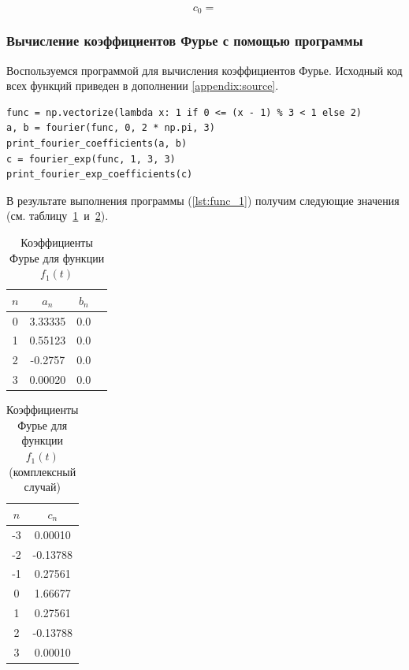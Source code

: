 \begin{equation}
    c_0 = 
\end{equation}

\subsubsection{Вычисление коэффициентов Фурье с помощью программы}
Воспользуемся программой для вычисления коэффициентов Фурье. Исходный код всех функций приведен в дополнении \ref{appendix:source}.

\begin{lstlisting}[style=python_white, caption=Вычисление коэффициентов Фурье, label=lst:func_1]
func = np.vectorize(lambda x: 1 if 0 <= (x - 1) % 3 < 1 else 2)
a, b = fourier(func, 0, 2 * np.pi, 3)
print_fourier_coefficients(a, b)
c = fourier_exp(func, 1, 3, 3)
print_fourier_exp_coefficients(c)
\end{lstlisting}

В результате выполнения программы (\ref{lst:func_1}) получим следующие значения (см. таблицу~\ref{tab:func_1}~и~\ref{tab:func_1_exp}).

\begin{table}[ht!]
    \centering
    \begin{tabular}{|c|c|c|c|}
        \hline
        $n$ & $a_n$ & $b_n$ \\
        \hline
        0 & 3.33335 & 0.0 \\
        1 & 0.55123 & 0.0 \\
        2 & -0.2757 & 0.0 \\
        3 & 0.00020 & 0.0 \\
        \hline
    \end{tabular}
    \caption{Коэффициенты Фурье для функции $f_1(t)$}
    \label{tab:func_1}
\end{table}

\begin{table}[ht!]
    \centering
    \begin{tabular}{|c|c|}
        \hline
        $n$ & $c_n$ \\
        \hline
        -3 & 0.00010 \\
        -2 & -0.13788 \\
        -1 & 0.27561 \\
        0 & 1.66677 \\
        1 & 0.27561 \\
        2 & -0.13788 \\
        3 & 0.00010 \\
        \hline
    \end{tabular}
    \caption{Коэффициенты Фурье для функции $f_1(t)$ (комплексный случай)}
    \label{tab:func_1_exp}
\end{table}

